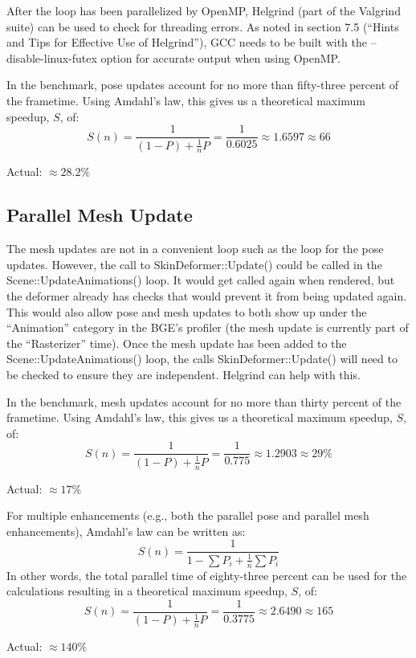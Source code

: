 \documentclass[]{article}
\begin{document}
After the loop has been parallelized by OpenMP, Helgrind (part of the Valgrind suite\cite{valgrind}) can be used to check for threading errors. As noted in section 7.5 (``Hints and Tips for Effective Use of Helgrind'')\cite{hgmanual}, GCC needs to be built with the --disable-linux-futex option for accurate output when using OpenMP.

In the benchmark, pose updates account for no more than fifty-three percent of the frametime. Using Amdahl's law, this gives us a theoretical maximum speedup, $S$, of:
\[
 S(n) = \frac{1}{\left(1 - P\right) + \frac{1}{n} P}
 = \frac{1}{0.6025}
 \approx 1.6597 \approx 66%
\]

Actual: $\approx28.2\%$


\subsection{Parallel Mesh Update}

The mesh updates are not in a convenient loop such as the loop for the pose updates. However, the call to SkinDeformer::Update() could be called in the Scene::UpdateAnimations() loop. It would get called again when rendered, but the deformer already has checks that would prevent it from being updated again. This would also allow pose and mesh updates to both show up under the ``Animation'' category in the BGE's profiler (the mesh update is currently part of the ``Rasterizer'' time). Once the mesh update has been added to the Scene::UpdateAnimations() loop, the calls SkinDeformer::Update() will need to be checked to ensure they are independent. Helgrind can help with this.

In the benchmark, mesh updates account for no more than thirty percent of the frametime. Using Amdahl's law, this gives us a theoretical maximum speedup, $S$, of:
\[
 S(n) = \frac{1}{\left(1 - P\right) + \frac{1}{n} P}
 = \frac{1}{0.775}
 \approx 1.2903 \approx 29\%
\]

Actual: $\approx17\%$

For multiple enhancements (e.g., both the parallel pose and parallel mesh enhancements), Amdahl's law can be written as:
\[
 S(n) = \frac{1}{1 - \sum{P_i} + \frac{1}{n} \sum{P_i}}
\]
In other words, the total parallel time of eighty-three percent can be used for the calculations resulting in a theoretical maximum speedup, $S$, of:
\[
 S(n) = \frac{1}{\left(1 - P\right) + \frac{1}{n} P}
 = \frac{1}{0.3775}
 \approx 2.6490 \approx 165%
\]

Actual: $\approx 140\%$
\end{document}

